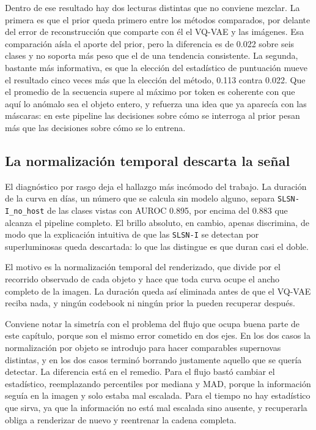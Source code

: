 Dentro de ese resultado hay dos lecturas distintas que no conviene mezclar. La primera es que el prior queda primero entre los métodos comparados, por delante del error de reconstrucción que comparte con él el VQ-VAE y las imágenes. Esa comparación aísla el aporte del prior, pero la diferencia es de 0.022 sobre seis clases y no soporta más peso que el de una tendencia consistente. La segunda, bastante más informativa, es que la elección del estadístico de puntuación mueve el resultado cinco veces más que la elección del método, 0.113 contra 0.022. Que el promedio de la secuencia supere al máximo por token es coherente con que aquí lo anómalo sea el objeto entero, y refuerza una idea que ya aparecía con las máscaras: en este pipeline las decisiones sobre cómo se interroga al prior pesan más que las decisiones sobre cómo se lo entrena.

\subsection{La normalización temporal descarta la señal}

El diagnóstico por rasgo deja el hallazgo más incómodo del trabajo. La duración de la curva en días, un número que se calcula sin modelo alguno, separa \texttt{SLSN-I\_no\_host} de las clases vistas con AUROC 0.895, por encima del 0.883 que alcanza el pipeline completo. El brillo absoluto, en cambio, apenas discrimina, de modo que la explicación intuitiva de que las \texttt{SLSN-I} se detectan por superluminosas queda descartada: lo que las distingue es que duran casi el doble.

El motivo es la normalización temporal del renderizado, que divide por el recorrido observado de cada objeto y hace que toda curva ocupe el ancho completo de la imagen. La duración queda así eliminada antes de que el VQ-VAE reciba nada, y ningún codebook ni ningún prior la pueden recuperar después.

Conviene notar la simetría con el problema del flujo que ocupa buena parte de este capítulo, porque son el mismo error cometido en dos ejes. En los dos casos la normalización por objeto se introdujo para hacer comparables supernovas distintas, y en los dos casos terminó borrando justamente aquello que se quería detectar. La diferencia está en el remedio. Para el flujo bastó cambiar el estadístico, reemplazando percentiles por mediana y MAD, porque la información seguía en la imagen y solo estaba mal escalada. Para el tiempo no hay estadístico que sirva, ya que la información no está mal escalada sino ausente, y recuperarla obliga a renderizar de nuevo y reentrenar la cadena completa.

